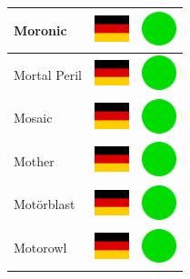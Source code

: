 \documentclass[12pt, a4paper, twoside]{report}
\begin{document}
\begin{center}
\begin{longtable}{|p{5cm}|p{2cm}|p{2cm}|}
 Moronic                                                    & \includegraphics[width=1cm]{../img/flags/de} &   \includegraphics[width=1cm]{../likes/y} \\ \hline
 Mortal Peril                                               & \includegraphics[width=1cm]{../img/flags/de} &   \includegraphics[width=1cm]{../likes/y} \\ \hline
 Mosaic                                                     & \includegraphics[width=1cm]{../img/flags/de} &   \includegraphics[width=1cm]{../likes/y} \\ \hline
 Mother                                                     & \includegraphics[width=1cm]{../img/flags/de} &   \includegraphics[width=1cm]{../likes/y} \\ \hline
 Motörblast                                                 & \includegraphics[width=1cm]{../img/flags/de} &   \includegraphics[width=1cm]{../likes/y} \\ \hline
 Motorowl                                                   & \includegraphics[width=1cm]{../img/flags/de} &   \includegraphics[width=1cm]{../likes/y} \\ \hline

\end{longtable}
\end{center}
\end{document}
